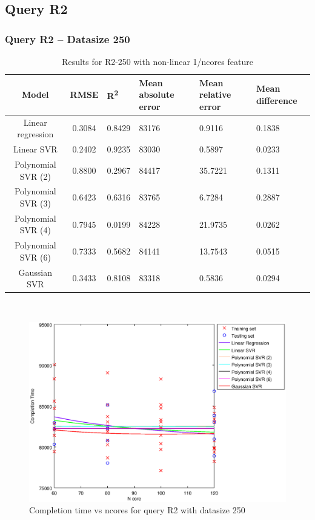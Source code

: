 \documentclass[a4paper,11pt]{article}
\begin{document}
\newpage
\subsection{Query R2}
\subsubsection{Query R2 -- Datasize 250}
\begin{table}[H]
	\centering
	\begin{adjustbox}{center}
		\begin{tabular}{c | c M{1.2cm} M{2.5cm} M{2.5cm} M{1.8cm}}
			Model & RMSE & R\textsuperscript{2} & Mean absolute error & Mean relative error & Mean difference \tabularnewline
			\hline
			Linear regression & 0.3084 & 0.8429 &  83176 & 0.9116 & 0.1838 \\
			Linear SVR & 0.2402 & 0.9235 &  83030 & 0.5897 & 0.0233 \\
			Polynomial SVR (2) & 0.8800 & 0.2967 &  84417 & 35.7221 & 0.1311 \\
			Polynomial SVR (3) & 0.6423 & 0.6316 &  83765 & 6.7284 & 0.2887 \\
			Polynomial SVR (4) & 0.7945 & 0.0199 &  84228 & 21.9735 & 0.0262 \\
			Polynomial SVR (6) & 0.7333 & 0.5682 &  84141 & 13.7543 & 0.0515 \\
			Gaussian SVR & 0.3433 & 0.8108 &  83318 & 0.5836 & 0.0294 \\
		\end{tabular}
	\end{adjustbox}
	\\
	\caption{Results for R2-250 with non-linear 1/ncores feature}
	\label{table_R2_prediction_all}
\end{table}

\begin {figure}[hbtp]
\centering
\includegraphics[width=\textwidth]{output/R2_250_NO_72_90_1_OVER_NCORES/plot_R2_250.eps}
\caption {Completion time vs ncores for query R2 with datasize 250}
\end {figure}
\end{document}

